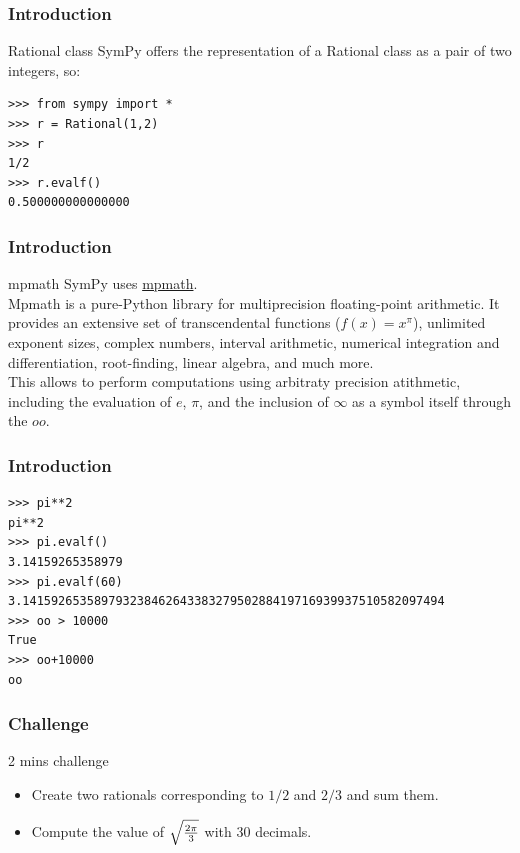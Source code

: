 \documentclass[10pt,colorlinks]{beamer}
\begin{document}
\begin{frame}[fragile]\frametitle{Introduction}
\begin{block}{Rational class}
SymPy offers the representation of a Rational class as a pair of two integers, so:
\begin{verbatim}
>>> from sympy import *
>>> r = Rational(1,2)
>>> r
1/2
>>> r.evalf()
0.500000000000000
\end{verbatim}

\end{block}

\end{frame}
\begin{frame}[fragile]\frametitle{Introduction}
\begin{block}{mpmath}
SymPy uses \href{http://code.google.com/p/mpmath/}{mpmath}. \\ 
Mpmath is a pure-Python library for multiprecision floating-point arithmetic. It provides an extensive set of transcendental functions ($f(x)=x^\pi$), unlimited exponent sizes, complex numbers, interval arithmetic, numerical integration and differentiation, root-finding, linear algebra, and much more. \\
This allows to perform computations using arbitraty precision atithmetic, including the evaluation of $e$, $\pi$, and the inclusion of $\infty$ as a symbol itself through the $oo$. 
\end{block}
\end{frame}

\begin{frame}[fragile]\frametitle{Introduction}

\begin{verbatim}
>>> pi**2
pi**2
>>> pi.evalf()
3.14159265358979
>>> pi.evalf(60)
3.14159265358979323846264338327950288419716939937510582097494
>>> oo > 10000
True
>>> oo+10000
oo
\end{verbatim}

\end{frame}

\begin{frame}[fragile]\frametitle{Challenge}
\begin{block}{2 mins challenge}
\begin{itemize}
    \item Create two rationals corresponding to $1/2$ and $2/3$ and sum them. 
    \item  Compute the value of $\sqrt{2 \pi \over 3}$ with 30 decimals.   
\end{itemize}
\end{block}

\end{frame}
\end{document}
